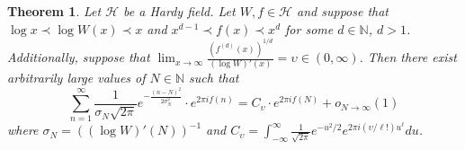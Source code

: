 \documentclass[12pt]{article}
\theoremstyle{plain} %
\newtheorem{theorem}{Theorem}[section]
\theoremstyle{definition} %
\theoremstyle{plain}
\theoremstyle{plain}
\numberwithin{equation}{section}
\newcommand{\N}{\mathbb{N}}
\newcommand{\1}{\mathbbm{1}}
\newcommand{\oo}{\infty}
\begin{document}
\begin{theorem}\label{thm:gaussian_dne}
     Let $\mathcal{H}$ be a Hardy field. Let $W,f\in \mathcal{H}$ and suppose that $\log x\prec \log W(x)\prec x$ and $x^{d-1}\prec f(x)\prec x^d$ for some $d\in \N$, $d>1$.  Additionally, suppose that $\lim_{x\to\oo}\frac{(f^{(d)}(x))^{1/d}}{(\log W)'(x)}=\upsilon\in(0,\oo)$. Then there exist arbitrarily large values of $N\in \N$ such that
\begin{equation}\label{eq:gaussian_again}
    \sum_{n=1}^{\oo}\frac{1}{\sigma_N\sqrt{2\pi}}e^{-\frac{(n-N)^2}{2\sigma_N^2}}\cdot e^{2\pi i f(n)}= C_{\upsilon}\cdot  e^{2\pi i f(N)}+o_{N\to\oo}(1)
   \end{equation}
   where $\sigma_N = ((\log W)'(N))^{-1}$ and $C_{\upsilon} = \int_{-\oo}^{\oo} \frac{1}{\sqrt{2\pi}}e^{-u^2/2}e^{2\pi i (\upsilon/\ell!)u^{\ell}}du$. 
\end{theorem}
\end{document}
